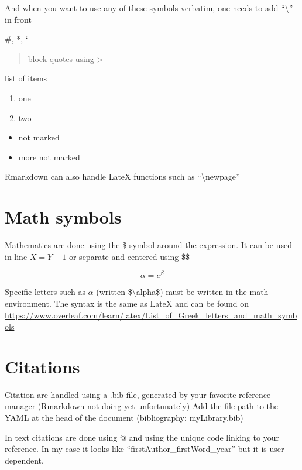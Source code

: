 \documentclass[
  11pt,
]{article}
\begin{document}
And when you want to use any of these symbols verbatim, one needs to add ``\textbackslash{}'' in front

\#, *, `

\begin{quote}
block quotes using \textgreater{}
\end{quote}

list of items

\begin{enumerate}
\def\labelenumi{\arabic{enumi}.}
\item
  one
\item
  two
\end{enumerate}

\begin{itemize}
\item
  not marked
\item
  more not marked
\end{itemize}

Rmarkdown can also handle LateX functions such as ``\textbackslash newpage''

\newpage

\hypertarget{math-symbols}{%
\section{Math symbols}\label{math-symbols}}

Mathematics are done using the \$ symbol around the expression. It can be used in line \(X = Y + 1\) or separate and centered using \$\$

\[\alpha = e{^\beta}\]

Specific letters such as \(\alpha\) (written \$\textbackslash alpha\$) must be written in the math environment. The syntax is the same as LateX and can be found on \url{https://www.overleaf.com/learn/latex/List_of_Greek_letters_and_math_symbols}

\hypertarget{citations}{%
\section{Citations}\label{citations}}

Citation are handled using a .bib file, generated by your favorite reference manager (Rmarkdown not doing yet unfortunately)
Add the file path to the YAML at the head of the document (bibliography: myLibrary.bib)

In text citations are done using @ and using the unique code linking to your reference. In my case it looks like ``firstAuthor\_firstWord\_year'' but it is user dependent.
\end{document}
